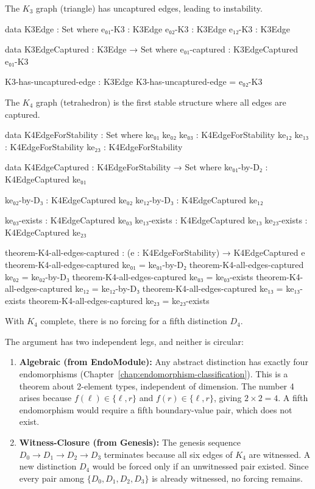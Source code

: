 \documentclass[11pt,a4paper]{book}
\begin{document}
The $K_3$ graph (triangle) has uncaptured edges, leading to instability.

\begin{code}
data K3Edge : Set where
  e₀₁-K3 : K3Edge
  e₀₂-K3 : K3Edge
  e₁₂-K3 : K3Edge

data K3EdgeCaptured : K3Edge → Set where
  e₀₁-captured : K3EdgeCaptured e₀₁-K3

K3-has-uncaptured-edge : K3Edge
K3-has-uncaptured-edge = e₀₂-K3
\end{code}

The $K_4$ graph (tetrahedron) is the first stable structure where all edges are captured.

\begin{code}
data K4EdgeForStability : Set where
  ke₀₁ ke₀₂ ke₀₃ : K4EdgeForStability
  ke₁₂ ke₁₃ : K4EdgeForStability
  ke₂₃ : K4EdgeForStability

data K4EdgeCaptured : K4EdgeForStability → Set where
  ke₀₁-by-D₂ : K4EdgeCaptured ke₀₁
  
  ke₀₂-by-D₃ : K4EdgeCaptured ke₀₂
  ke₁₂-by-D₃ : K4EdgeCaptured ke₁₂
  
  ke₀₃-exists : K4EdgeCaptured ke₀₃
  ke₁₃-exists : K4EdgeCaptured ke₁₃
  ke₂₃-exists : K4EdgeCaptured ke₂₃

theorem-K4-all-edges-captured : (e : K4EdgeForStability) → K4EdgeCaptured e
theorem-K4-all-edges-captured ke₀₁ = ke₀₁-by-D₂
theorem-K4-all-edges-captured ke₀₂ = ke₀₂-by-D₃
theorem-K4-all-edges-captured ke₀₃ = ke₀₃-exists
theorem-K4-all-edges-captured ke₁₂ = ke₁₂-by-D₃
theorem-K4-all-edges-captured ke₁₃ = ke₁₃-exists
theorem-K4-all-edges-captured ke₂₃ = ke₂₃-exists
\end{code}

With $K_4$ complete, there is no forcing for a fifth distinction $D_4$.

The argument has two independent legs, and neither is circular:

\begin{enumerate}
\item \textbf{Algebraic (from EndoModule):} Any abstract distinction has exactly four
      endomorphisms (Chapter~\ref{chap:endomorphism-classification}). This is a
      theorem about 2-element types, independent of dimension. The number 4 arises
      because $f(\ell) \in \{\ell, r\}$ and $f(r) \in \{\ell, r\}$, giving
      $2 \times 2 = 4$. A fifth endomorphism would require a fifth boundary-value
      pair, which does not exist.

\item \textbf{Witness-Closure (from Genesis):} The genesis sequence
      $D_0 \to D_1 \to D_2 \to D_3$ terminates because all six edges of $K_4$
      are witnessed. A new distinction $D_4$ would be forced only if an
      unwitnessed pair existed. Since every pair among $\{D_0, D_1, D_2, D_3\}$
      is already witnessed, no forcing remains.
\end{enumerate}
\end{document}
